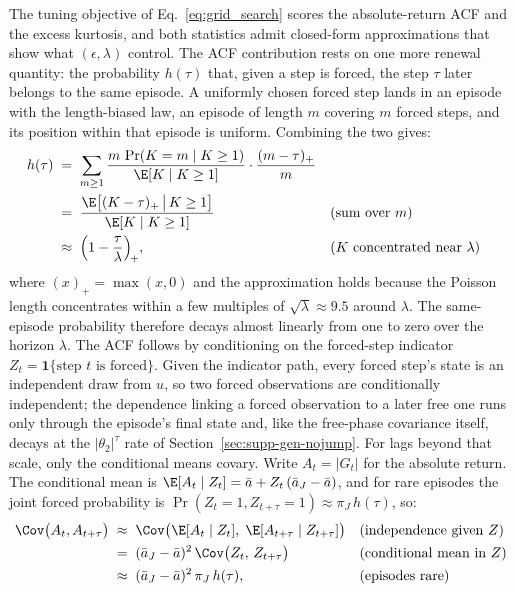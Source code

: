 The tuning objective of Eq.~\eqref{eq:grid_search} scores the
absolute-return ACF and the excess kurtosis, and both statistics
admit closed-form approximations that show what $(\epsilon, \lambda)$
control. The ACF contribution rests on one more renewal quantity: the
probability $h(\tau)$ that, given a step is forced, the step $\tau$
later belongs to the same episode. A uniformly chosen forced step
lands in an episode with the length-biased law, an episode of length
$m$ covering $m$ forced steps, and its position within that episode
is uniform. Combining the two gives:
\begin{align}
  h(\tau)
   &\;=\; \sum_{m \ge 1}
     \frac{m\, \Pr(K = m \mid K \ge 1)}{\E[K \mid K \ge 1]}
     \cdot \frac{(m - \tau)_+}{m}
     \notag \\
   &\;=\; \frac{\E\big[(K - \tau)_+ \,\big|\, K \ge 1\big]}
     {\E[K \mid K \ge 1]}
     && \text{(sum over $m$)} \notag \\
   &\;\approx\; \Big(1 - \frac{\tau}{\lambda}\Big)_{\!+},
     && \text{($K$ concentrated near $\lambda$)}
  \label{eq:supp-h}
\end{align}
where $(x)_+ = \max(x, 0)$ and the approximation holds because the
Poisson length concentrates within a few multiples of
$\sqrt{\lambda} \approx 9.5$ around $\lambda$. The same-episode
probability therefore decays almost linearly from one to zero over
the horizon $\lambda$. The ACF follows by conditioning on the
forced-step indicator $Z_t = \mathbf{1}\{\text{step $t$ is forced}\}$.
Given the indicator path, every forced step's state is an independent
draw from $u$, so two forced observations are conditionally
independent; the dependence linking a forced observation to a later
free one runs only through the episode's final state and, like the
free-phase covariance itself, decays at the
$|\theta_2|^\tau$ rate of Section~\ref{sec:supp-gen-nojump}. For lags
beyond that scale, only the conditional means covary. Write
$A_t = |G_t|$ for the absolute return. The conditional mean is
$\E[A_t \mid Z_t] = \bar a + Z_t\, (\bar a_J - \bar a)$,
and for rare episodes the joint forced probability is
$\Pr(Z_t = 1, Z_{t+\tau} = 1) \approx \pi_J\, h(\tau)$, so:
\begin{align}
  \Cov\big(A_t, A_{t+\tau}\big)
   &\;\approx\;
     \Cov\big(\E[A_t \mid Z_t],\;
              \E[A_{t+\tau} \mid Z_{t+\tau}]\big)
     && \text{(independence given $Z$)} \notag \\
   &\;=\; (\bar a_J - \bar a)^2\,
     \Cov\big(Z_t,\, Z_{t+\tau}\big)
     && \text{(conditional mean in $Z$)} \notag \\
   &\;\approx\; (\bar a_J - \bar a)^2\, \pi_J\, h(\tau),
     && \text{(episodes rare)}
  \label{eq:supp-acf-wj}
\end{align}
